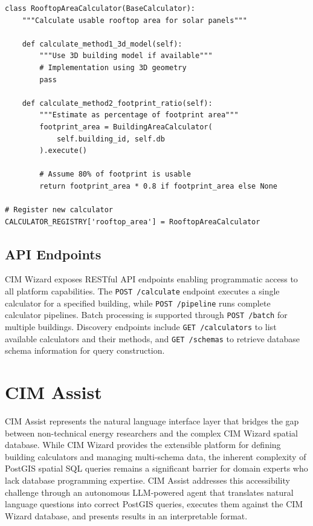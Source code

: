 \begin{lstlisting}[style=pythonstyle, caption=Extending platform with new calculator]
class RooftopAreaCalculator(BaseCalculator):
    """Calculate usable rooftop area for solar panels"""
    
    def calculate_method1_3d_model(self):
        """Use 3D building model if available"""
        # Implementation using 3D geometry
        pass
    
    def calculate_method2_footprint_ratio(self):
        """Estimate as percentage of footprint area"""
        footprint_area = BuildingAreaCalculator(
            self.building_id, self.db
        ).execute()
        
        # Assume 80% of footprint is usable
        return footprint_area * 0.8 if footprint_area else None

# Register new calculator
CALCULATOR_REGISTRY['rooftop_area'] = RooftopAreaCalculator
\end{lstlisting}

\subsection{API Endpoints}

CIM Wizard exposes RESTful API endpoints enabling programmatic access to all platform capabilities. The \texttt{POST /calculate} endpoint executes a single calculator for a specified building, while \texttt{POST /pipeline} runs complete calculator pipelines. Batch processing is supported through \texttt{POST /batch} for multiple buildings. Discovery endpoints include \texttt{GET /calculators} to list available calculators and their methods, and \texttt{GET /schemas} to retrieve database schema information for query construction.
\section{CIM Assist}

CIM Assist represents the natural language interface layer that bridges the gap between non-technical energy researchers and the complex CIM Wizard spatial database. While CIM Wizard provides the extensible platform for defining building calculators and managing multi-schema data, the inherent complexity of PostGIS spatial SQL queries remains a significant barrier for domain experts who lack database programming expertise. CIM Assist addresses this accessibility challenge through an autonomous LLM-powered agent that translates natural language questions into correct PostGIS queries, executes them against the CIM Wizard database, and presents results in an interpretable format.

